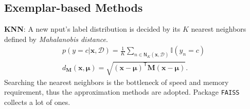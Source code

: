 \subsection{Exemplar-based Methods}

\textbf{KNN}: A new nput's label distribution is decided by its $K$ nearest neighbors defined by \textit{Mahalanobis distance}.
\begin{gather}
    p(y=c|\bm{x},\mathcal{D})=\frac{1}{K}\sum_{n\in\mathsf{N}_K(\bm{x},\mathcal{D})} \mathbb{I}(y_n=c) \label{eq:knn} \\
    d_\mathbf{M}(\bm{x},\bm{\mu})=\sqrt{(\bm{x}-\bm{\mu})^\mathsf{T}\mathbf{M}(\bm{x}-\bm{\mu})}.
\end{gather}
Searching the nearest neighbors is the bottleneck of speed and memory requirement, thus the approximation methods are adopted. 
Package \texttt{FAISS} collects a lot of ones.

